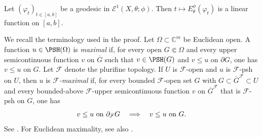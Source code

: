 \begin{proposition}\label{prop:energylinear}
    Let $(\varphi_t)_{t\in [a,b]}$ be a geodesic in $\mathcal{E}^1(X,\theta;\phi)$. Then $t\mapsto E_{\theta}^{\phi}(\varphi_t)$ is a linear function on $[a,b]$.
\end{proposition}
We recall the terminology used in the proof. Let $\Omega\subset\mathbb{C}^m$ be Euclidean open. A function $u\in\PSH(\Omega)$ is \emph{maximal} if, for every open $G\Subset\Omega$ and every upper semicontinuous function $v$ on $\overline G$ such that $v\in\PSH(G)$ and $v\leq u$ on $\partial G$, one has $v\leq u$ on $G$. Let $\mathcal F$ denote the plurifine topology. If $U$ is $\mathcal F$-open and $u$ is $\mathcal F$-psh on $U$, then $u$ is \emph{$\mathcal F$-maximal} if, for every bounded $\mathcal F$-open set $G$ with $G\subset\overline G^{\mathcal F}\subset U$ and every bounded-above $\mathcal F$-upper semicontinuous function $v$ on $\overline G^{\mathcal F}$ that is $\mathcal F$-psh on $G$, one has
\[
    v\leq u\textup{ on }\partial_{\mathcal F}G
    \quad\Longrightarrow\quad
    v\leq u\textup{ on }G.
\]
See \cite[Definition~5.9.1]{EKF}. For Euclidean maximality, see also \cite[Definition~9.6.5]{FPT}.
